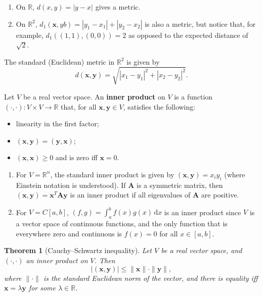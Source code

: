 \documentclass[letter-paper]{tufte-book}
\newtheorem{theorem}{\color{pastel-blue}Theorem}[section]
\newenvironment{example}[1][Example]{\begin{trivlist}
\item[\hskip \labelsep {\bfseries #1}]}{\end{trivlist}}
\newcommand{\xb}{\boldsymbol{x}}
\newcommand{\yb}{\boldsymbol{y}}
\begin{document}
\begin{example}
  \begin{enumerate}
    \item On $\mathbb{R}$, $d(x,y) = |y - x|$ gives a metric.
    \item On $\mathbb{R}^2$, $d_1 (\xb, yb) = |y_1 - x_1| + |y_2 - x_2|$ is also a
    metric, but notice that, for example, $d_1( (1, 1), (0, 0) ) = 2$ as opposed
    to the expected distance of $\sqrt{2}$.
  \end{enumerate}
\end{example}

The standard (Euclidean) metric in $\mathbb{R}^2$ is given by
\begin{equation*}
  d(\xb, \yb) = \sqrt{|x_1 - y_1|^2 + |x_2 - y_2|^2}.
\end{equation*}

Let $V$ be a real vector space. An \textbf{inner product} on $V$ is a
function $(\cdot, \cdot) : V\times V\to \mathbb{R}$ that, for all $\xb, \yb\in
V$, satisfies the following:
\begin{itemize}
  \item linearity in the first factor;
  \item $(\xb, \yb) = (\yb, \xb)$;
  \item $(\xb, \xb) \geq 0$ and is zero iff $\xb = 0$.
\end{itemize}
\begin{example}
  \begin{enumerate}
    \item For $V = \mathbb{R}^n$, the standard inner product is given by $(\xb,
    \yb) = x_i y_i$ (where Einstein notation is understood). If $\boldsymbol{A}$
    is a symmetric matrix, then $(\xb, \yb) = \xb^T \boldsymbol{A} \yb$ is an
    inner product if all eigenvalues of $\boldsymbol{A}$ are positive.
    
    \item For $V = C[a, b]$, $(f, g) = \int_a^b f(x) g(x)\, \mathrm{d}x$ is an
    inner product since $V$ is a vector space of continuous functions, and the
    only function that is everywhere zero and continuous is $f(x) = 0$ for all
    $x\in[a, b]$.
  \end{enumerate}
\end{example}

\begin{theorem}[Cauchy--Schwartz inequality]
  Let $V$ be a real vector space, and $(\cdot, \cdot)$ an inner product on $V$.
  Then
  \begin{equation*}
    \left|(\xb, \yb)\right| \leq \|\xb\| \cdot \|\yb\|,
  \end{equation*}
  where $\|\cdot\|$ is the standard Euclidean norm of the vector, and there is
  equality iff $\xb = \lambda \yb$ for some $\lambda \in \mathbb{R}$.
\end{theorem}
\end{document}
